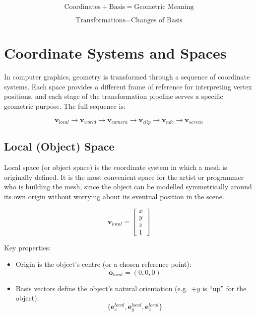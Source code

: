 \documentclass[11pt]{article}
\begin{document}
\begin{equation}
    \text{Coordinates} + \text{Basis} = \text{Geometric Meaning}
\end{equation}

\begin{equation}
    \text{Transformations} = \text{Changes of Basis}
\end{equation}

\section{Coordinate Systems and Spaces}
\label{sec:coordinate-systems}

In computer graphics, geometry is transformed through a sequence of coordinate systems. Each space provides a different frame of reference for interpreting vertex positions, and each stage of the transformation pipeline serves a specific geometric purpose. The full sequence is:

\begin{equation}
    \mathbf{v}_{local}
    \rightarrow
    \mathbf{v}_{world}
    \rightarrow
    \mathbf{v}_{camera}
    \rightarrow
    \mathbf{v}_{clip}
    \rightarrow
    \mathbf{v}_{ndc}
    \rightarrow
    \mathbf{v}_{screen}
\end{equation}


\subsection{Local (Object) Space}

Local space (or object space) is the coordinate system in which a mesh is originally defined. It is the most convenient space for the artist or programmer who is building the mesh, since the object can be modelled symmetrically around its own origin without worrying about its eventual position in the scene.

\begin{equation}
    \mathbf{v}_{local} =
    \begin{bmatrix}
        x \\
        y \\
        z \\
        1
    \end{bmatrix}
\end{equation}

Key properties:

\begin{itemize}
    \item Origin is the object's centre (or a chosen reference point):
    \begin{equation}
        \mathbf{o}_{local} = (0,0,0)
    \end{equation}
    \item Basis vectors define the object's natural orientation (e.g.\ $+y$ is ``up'' for the object):
    \begin{equation}
        \{\mathbf{e}_x^{local}, \mathbf{e}_y^{local}, \mathbf{e}_z^{local}\}
    \end{equation}
\end{itemize}
\end{document}
